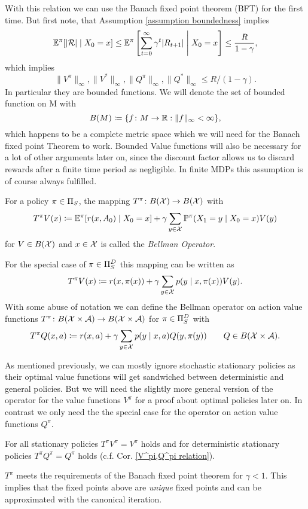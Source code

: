 With this relation we can use the Banach fixed point theorem (BFT) for the first time. But first note, that Assumption \ref{assumption boundedness} implies
\[
	\mathbb{E}^\pi[|\mathcal{R}| \mid X_0 = x]\le\mathbb{E}^\pi\left[\sum_{t=0}^\infty \gamma^t |R_{t+1}| \;\middle|\; X_0=x \right]
	\le \frac{R}{1-\gamma},
\]
which implies 
\[
	\|V^\pi\|_\infty,\|V^*\|_\infty, \|Q^\pi\|_\infty,\|Q^*\|_\infty \le R/(1-\gamma).
\]
In particular they are bounded functions. We will denote the set of bounded function on M with 
\[
	B(M)\coloneqq \{f\colon M\to\mathbb{R} : \|f\|_\infty <\infty \},
\]
which happens to be a complete metric space which we will need for the Banach fixed point Theorem to work. Bounded Value functions will also be necessary for a lot of other arguments later on, since the discount factor allows us to discard rewards after a finite time period as negligible.  In finite MDPs this assumption is of course always fulfilled. 


\begin{definition}
	For a policy \(\pi\in\Pi_S\), the mapping \(T^\pi\colon B(\mathcal{X})\to B(\mathcal{X})\) with
	\[
		T^\pi V(x)\coloneqq \mathbb{E}^\pi[r(x,A_0)\mid X_0=x] 
		+ \gamma \sum_{y\in\mathcal{X}} \mathbb{P}^\pi(X_1=y\mid X_0=x) V(y)
	\]
	for \(V\in B(\mathcal{X})\) and \(x\in\mathcal{X}\) is called the \emph{Bellman Operator}.

	\noindent For the special case of \(\pi\in\Pi_S^D\) this mapping can be written as
	\[
		T^\pi V(x)\coloneqq r(x,\pi(x))+\gamma\sum_{y\in\mathcal{X}}p(y\mid x,\pi(x)) V(y).
	\]
	With some abuse of notation we can define the Bellman operator on action value functions \(T^\pi\colon B(\mathcal{X}\times\mathcal{A})\to B(\mathcal{X}\times\mathcal{A})\) for \(\pi\in\Pi_S^D\) with
	\[
		T^\pi Q(x,a)\coloneqq r(x,a)
		+\gamma\sum_{y\in\mathcal{X}}p(y\mid x,a) Q(y,\pi(y)) 
		\qquad Q\in B(\mathcal{X}\times\mathcal{A}).
	\]	
\end{definition}
As mentioned previously, we can mostly ignore stochastic stationary policies as their optimal value functions will get sandwiched between deterministic and general policies. But we will need the slightly more general version of the operator for the value functions \(V^\pi\) for a proof about optimal policies later on. In contrast we only need the the special case for the operator on action value functions \(Q^\pi\).

\begin{thm}\label{T^pi unique}
	For all stationary policies \(T^\pi V^\pi=V^\pi \) holds and for deterministic stationary policies \(T^\pi Q^\pi=Q^\pi\) holds (c.f. Cor. \ref{V^pi,Q^pi relation}).

	\(T^\pi\) meets the requirements of the Banach fixed point theorem for \({\gamma<1}\). This implies that the fixed points above are \emph{unique} fixed points and can be approximated with the canonical iteration. 
\end{thm}

